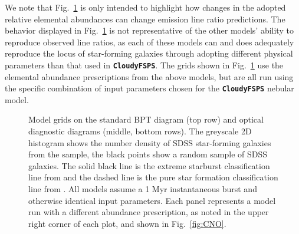 \documentclass[preprint2,trackchanges]{aastex62}
\newcommand{\CloudyFSPS}{{\tt \textbf{CloudyFSPS}}\xspace}
\begin{document}
We note that Fig.~\ref{fig:BPT} is only intended to highlight how changes in the adopted relative elemental abundances can change emission line ratio predictions. The behavior displayed in Fig.~\ref{fig:BPT} is not representative of the other models' ability to reproduce observed line ratios, as each of these models can and does adequately reproduce the locus of star-forming galaxies through adopting different physical parameters than that used in \CloudyFSPS. The grids shown in Fig.~\ref{fig:BPT} use the elemental abundance prescriptions from the above models, but are all run using the specific combination of input parameters chosen for the \CloudyFSPS nebular model.

\begin{figure}
  \begin{center}
    \caption{Model grids on the standard BPT diagram (top row) and optical diagnostic diagrams (middle, bottom rows). The greyscale 2D histogram shows the number density of SDSS star-forming galaxies from the \citet{Telford+2016} sample, the black points show a random sample of SDSS galaxies. The solid black line is the extreme starburst classification line from \citet{Kewley+2001} and the dashed line is the pure star formation classification line from \citet{Kauffmann+2003a}. All models assume a 1 Myr instantaneous burst and otherwise identical input parameters. Each panel represents a model run with a different abundance prescription, as noted in the upper right corner of each plot, and shown in Fig.~\ref{fig:CNO}.}
    \label{fig:BPT}
  \end{center}
\end{figure}
\end{document}

